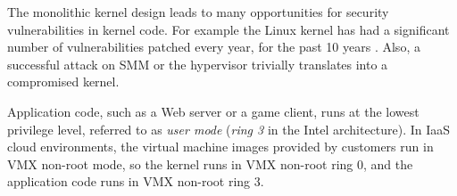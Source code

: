 The monolithic kernel design leads to many opportunities for security
vulnerabilities in kernel code. For example the Linux kernel has had a
significant number of vulnerabilities patched every year, for the past 10 years
\cite{cvedetails2014linux} \cite{chen2011linux}. Also, a successful attack on
SMM or the hypervisor trivially translates into a compromised kernel.

Application code, such as a Web server or a game client, runs at the lowest
privilege level, referred to as \textit{user mode} (\textit{ring 3} in the
Intel architecture). In IaaS cloud environments, the virtual machine images
provided by customers run in VMX non-root mode, so the kernel runs in VMX
non-root ring 0, and the application code runs in VMX non-root ring 3.
